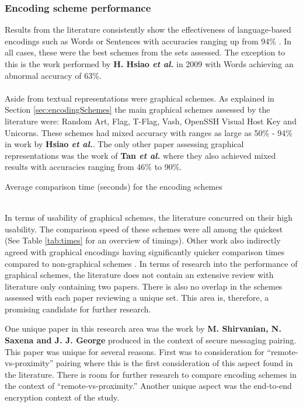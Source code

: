 \subsubsection*{Encoding scheme performance}
Results 
from the literature consistently show the effectiveness of language-based encodings such as Words or Sentences with accuracies ranging up from 94\% \cite{dechand2016empirical}\cite{tan2017can}\cite{kainda2009usability}. In all cases, these were the best schemes from the sets assessed. The exception to this is the work performed by \textbf{H. Hsiao \textit{et al.}}\cite{hsiao2009study} in 2009 with Words achieving an abnormal accuracy of 63\%.
\\\\
Aside from textual representations were graphical schemes. As explained in Section \ref{sec:encodingSchemes} the main graphical schemes assessed by the literature were: Random Art, Flag, T-Flag, Vash, OpenSSH Visual Host Key and Unicorns. These schemes had mixed accuracy with ranges as large as 50\% - 94\% in work by \textbf{Hsiao \textit{et al.}}\cite{hsiao2009study}. The only other paper assessing graphical representations was the work of \textbf{Tan \textit{et al.}}\cite{tan2017can} where they also achieved mixed results with accuracies ranging from 46\% to 90\%.
\\
\begin{table}[h!]
    \makebox[\textwidth][c]{
        
    }%
    \caption{Average comparison time (seconds) for the encoding schemes}
    \label{tab:times}
\end{table}
\\
In terms of usability of graphical schemes, the literature concurred on their high usability. The comparison speed of these schemes were all among the quickest (See Table \ref{tab:times} for an overview of timings). Other work also indirectly agreed with graphical encodings having significantly quicker comparison times compared to non-graphical schemes \cite{dechand2016empirical, kainda2009usability}.
In terms of research into the performance of graphical schemes, the literature does not contain an extensive review with literature only containing two papers. There is also no overlap in the schemes assessed with each paper reviewing a unique set. This area is, therefore, a promising candidate for further research.

One unique paper in this research area was the work by \textbf{M. Shirvanian, N. Saxena and J. J. George}\cite{shirvanian2017pitfalls} produced in the context of secure messaging pairing. This paper was unique for several reasons. First was to consideration for ``remote-vs-proximity'' pairing where this is the first consideration of this aspect found in the literature. There is room for further research to compare encoding schemes in the context of ``remote-vs-proximity.'' Another unique aspect was the end-to-end encryption context of the study.

